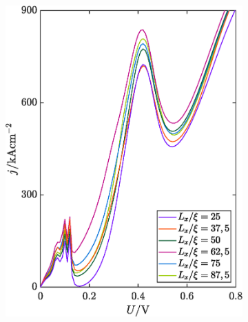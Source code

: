 \begin{figure}
    \centering
    \begin{subfigure}[b]{0.48\textwidth}
        \centering
        \includegraphics[width=\textwidth]{plots/IV/IV_Lx_variation.eps}
        \label{fig:iv3_1}
    \end{subfigure}
    \hfill
    \begin{subfigure}[b]{0.48\textwidth}
        \centering

\end{subfigure}
\end{figure}

